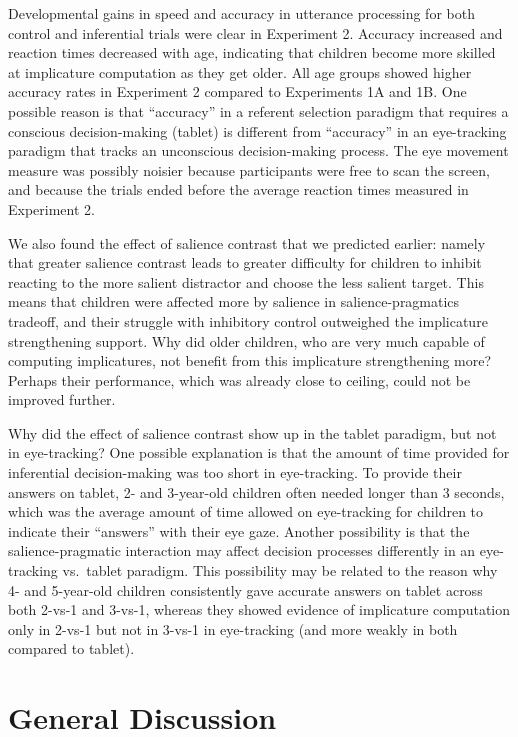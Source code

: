 \documentclass{rsos}
\begin{document}
Developmental gains in speed and accuracy in utterance processing for
both control and inferential trials were clear in Experiment 2. Accuracy
increased and reaction times decreased with age, indicating that
children become more skilled at implicature computation as they get
older. All age groups showed higher accuracy rates in Experiment 2
compared to Experiments 1A and 1B. One possible reason is that
``accuracy'' in a referent selection paradigm that requires a conscious
decision-making (tablet) is different from ``accuracy'' in an
eye-tracking paradigm that tracks an unconscious decision-making
process. The eye movement measure was possibly noisier because
participants were free to scan the screen, and because the trials ended
before the average reaction times measured in Experiment 2.

We also found the effect of salience contrast that we predicted earlier:
namely that greater salience contrast leads to greater difficulty for
children to inhibit reacting to the more salient distractor and choose
the less salient target. This means that children were affected more by
salience in salience-pragmatics tradeoff, and their struggle with
inhibitory control outweighed the implicature strengthening support. Why
did older children, who are very much capable of computing implicatures,
not benefit from this implicature strengthening more? Perhaps their
performance, which was already close to ceiling, could not be improved
further.

Why did the effect of salience contrast show up in the tablet paradigm,
but not in eye-tracking? One possible explanation is that the amount of
time provided for inferential decision-making was too short in
eye-tracking. To provide their answers on tablet, 2- and 3-year-old
children often needed longer than 3 seconds, which was the average
amount of time allowed on eye-tracking for children to indicate their
``answers'' with their eye gaze. Another possibility is that the
salience-pragmatic interaction may affect decision processes differently
in an eye-tracking vs.~tablet paradigm. This possibility may be related
to the reason why 4- and 5-year-old children consistently gave accurate
answers on tablet across both 2-vs-1 and 3-vs-1, whereas they showed
evidence of implicature computation only in 2-vs-1 but not in 3-vs-1 in
eye-tracking (and more weakly in both compared to tablet).

\section{General Discussion}\label{general-discussion}
\end{document}
